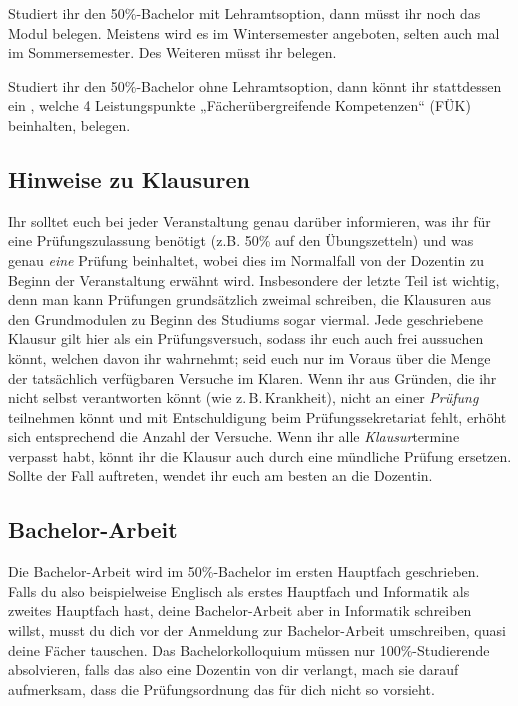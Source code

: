 Studiert ihr den 50\%-Bachelor mit Lehramtsoption, dann müsst ihr noch das Modul  belegen. Meistens wird es im Wintersemester angeboten, selten auch mal im Sommersemester. Des Weiteren müsst ihr  belegen.

Studiert ihr den 50\%-Bachelor ohne Lehramtsoption, dann könnt ihr stattdessen ein , welche 4 Leistungspunkte „Fächerübergreifende Kompetenzen“ (FÜK) beinhalten, belegen.

\vspace{-1mm}

\subsection{Hinweise zu Klausuren}
Ihr solltet euch bei jeder Veranstaltung genau darüber informieren, was ihr für eine Prüfungszulassung benötigt (z.B. 50\% auf den Übungszetteln) und was genau \emph{eine} Prüfung beinhaltet, wobei dies im Normalfall von der Dozentin zu Beginn der Veranstaltung erwähnt wird. Insbesondere der letzte Teil ist wichtig, denn man kann Prüfungen grundsätzlich zweimal schreiben, die Klausuren aus den Grundmodulen zu Beginn des Studiums sogar viermal. Jede geschriebene Klausur gilt hier als ein Prüfungsversuch, sodass ihr euch auch frei aussuchen könnt, welchen davon ihr wahrnehmt; seid euch nur im Voraus über die Menge der tatsächlich verfügbaren Versuche im Klaren. Wenn ihr aus Gründen, die ihr nicht selbst verantworten könnt (wie z.\,B.\,Krankheit), nicht an einer \emph{Prüfung} teilnehmen könnt und mit Entschuldigung beim Prüfungssekretariat fehlt, erhöht sich entsprechend die Anzahl der Versuche. Wenn ihr alle \emph{Klausur}termine verpasst habt, könnt ihr die Klausur auch durch eine mündliche Prüfung ersetzen. Sollte der Fall auftreten, wendet ihr euch am besten an die Dozentin.


\subsection{Bachelor-Arbeit}
Die Bachelor-Arbeit wird im 50\%-Bachelor im ersten Hauptfach geschrieben. Falls du also beispielweise Englisch als erstes Hauptfach und Informatik als zweites Hauptfach hast, deine Bachelor-Arbeit aber in Informatik schreiben willst, musst du dich vor der Anmeldung zur Bachelor-Arbeit umschreiben, quasi deine Fächer tauschen. Das Bachelorkolloquium müssen nur 100\%-Studierende absolvieren, falls das also eine Dozentin von dir verlangt, mach sie darauf aufmerksam, dass die Prüfungsordnung das für dich nicht so vorsieht.
